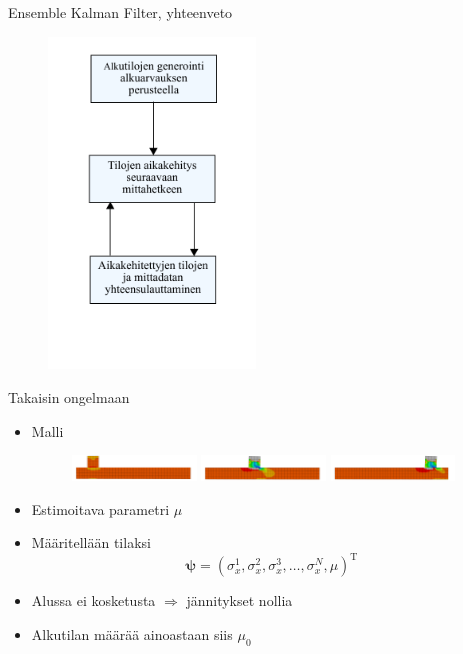 \documentclass{beamer}
\begin{document}
\begin{frame}{Ensemble Kalman Filter, yhteenveto}

\begin{figure}
\includegraphics[width=5.5cm]{enkf_luuppi.pdf}
\end{figure}

\end{frame}

\begin{frame}{Takaisin ongelmaan}

\begin{itemize}
\item Malli
\begin{figure}
\includegraphics[width=3.3cm]{anim1.pdf}
\includegraphics[width=3.3cm]{anim3.pdf}
\includegraphics[width=3.3cm]{anim5.pdf}
\end{figure}

\item Estimoitava parametri $\mu$
\item Määritellään tilaksi
\[
  \boldsymbol{\psi} = (\sigma_x^1, \sigma_x^2, \sigma_x^3, \dots, \sigma_x^N, \mu)^\mathrm{T}
\]
\item Alussa ei kosketusta $\Rightarrow$ jännitykset nollia
\item Alkutilan määrää ainoastaan siis $\mu_0$
\end{itemize}

\end{frame}
\end{document}
